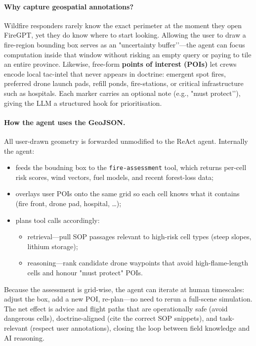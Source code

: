 \documentclass[lang=english,inputenc=utf8,fontsize=10pt]{ldvarticle}
\begin{document}
\paragraph{Why capture geospatial annotations?}
Wildfire responders rarely know the exact perimeter at the moment they
open FireGPT, yet they do know where to start looking.
Allowing the user to draw a fire-region bounding box serves as an
"uncertainty buffer’’—the agent can focus computation inside that window
without risking an empty query or paying to tile an entire province.  
Likewise, free-form \textbf{points of interest (POIs)} let crews encode
local tac-intel that never appears in doctrine: emergent spot fires,
preferred drone launch pads, refill ponds, fire-stations, or critical
infrastructure such as hospitals.  Each marker carries an optional note
(e.g., "must protect’’), giving the LLM a structured hook for
prioritisation.

\paragraph{How the agent uses the GeoJSON.}
All user-drawn geometry is forwarded unmodified to the ReAct agent.
Internally the agent:

\begin{itemize}
  \item feeds the boudning box to the \texttt{fire-assessment} tool,
        which returns per-cell risk scores, wind vectors, fuel models, and
        recent forest-loss data;
  \item overlays user POIs onto the same grid so each cell knows what it
        contains (fire front, drone pad, hospital, \ldots);
  \item plans tool calls accordingly:
        \begin{itemize}
          \item retrieval—pull SOP passages relevant to high-risk
                cell types (steep slopes, lithium storage);
          \item reasoning—rank candidate drone waypoints that avoid
                high-flame-length cells and honour "must protect"
                POIs.
        \end{itemize}
\end{itemize}

Because the assessment is grid-wise, the agent can iterate at human
timescales: adjust the box, add a new POI, re-plan—no need to rerun a
full-scene simulation.  The net effect is advice and flight paths that are
operationally safe (avoid dangerous cells), doctrine-aligned
(cite the correct SOP snippets), and task-relevant (respect user
annotations), closing the loop between field knowledge and AI reasoning.
\end{document}
